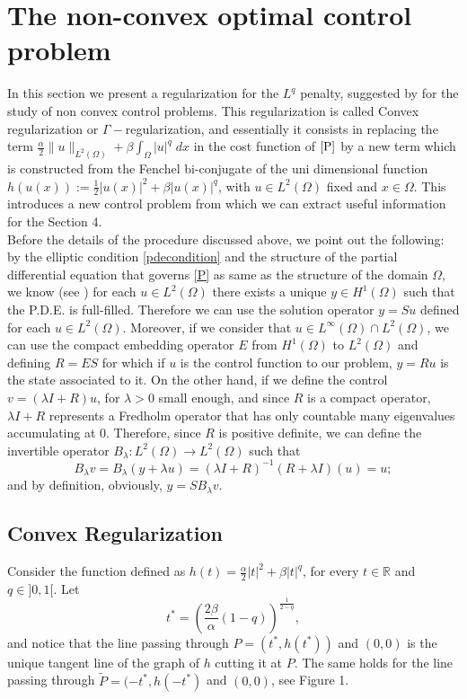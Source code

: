 \documentclass[11pt,a4paper]{amsart}
\newcommand{\om}{\Omega}
\newcommand{\norm}[1]{\lVert #1 \rVert}
\begin{document}
\section{The non-convex optimal control problem}

In this section we present a regularization for the $L^q$ penalty, suggested by \cite{eck} for the study of non convex control problems. This regularization is called Convex regularization or $\Gamma-$regularization, and essentially it consists in replacing the term $\frac{\alpha}{2}\norm{u}_{L^2(\Omega)}+\beta\int_{\Omega}|u|^q\; dx$ in the cost function of $\eqref{P}$ by a new term which is constructed from the Fenchel bi-conjugate of the uni dimensional function $h(u(x)):=\frac{1}{2}|u(x)|^2+\beta|u(x)|^q$, with $u\in L^{2}(\Omega)$ fixed and $x\in \Omega$. This introduces a new control problem from which we can extract useful information for the Section 4.\\

Before the details of the procedure discussed above, we point out the following: by the elliptic condition \eqref{pdecondition} and the structure of the partial differential equation that governs \eqref{P} as same as the structure of the domain $\Omega$, we know (see \cite{trol}) for each $u\in L^2(\Omega)$ there exists a unique $y\in H^1(\Omega)$ such that the P.D.E. is full-filled. Therefore we can use the solution operator $y=Su$ defined for each $u\in L^2(\Omega)$. Moreover, if we consider that $u\in L^{\infty}(\Omega)\cap L^2(\Omega)$, we can use the compact embedding operator $E$ from $H^1(\Omega)$ to $L^2(\Omega)$ and defining $R=ES$ for which if $u$ is the control function to our problem, $y=Ru$ is the state associated to it. On the other hand, if we define the control $v=(\lambda I+R)u$, for $\lambda>0$ small enough, and since  $R$ is a compact operator, $\lambda I+R$ represents a Fredholm operator that has only countable many eigenvalues accumulating at $0$. Therefore, since $R$ is positive definite, we can define the invertible operator $B_{\lambda}:L^{2}(\om)\to L^{2}(\om)$ such that
\[    B_{\lambda}v=B_{\lambda}(y+\lambda u)=(\lambda I+R)^{-1}(R+\lambda I)(u)=u;
\]
and by definition, obviously, $y=SB_{\lambda}v$. 


\subsection{Convex Regularization}

 Consider the function defined as $h(t)=\frac{\alpha}{2}|t|^2+\beta |t|^q$, for every $t\in \mathbb{R}$ and $q\in ]0,1[$. Let 
    \[
    t^*=\left(\frac{2\beta}{\alpha}(1-q)\right)^{\frac{1}{2-q}},
    \]
    and notice that the line passing through $P=(t^*,h(t^*))$ and $(0,0)$ is the unique tangent line of the graph of $h$ cutting it at $P$. The same holds for the line passing through $\tilde{P}=(-t^*,h(-t^*)$ and $(0,0)$, see Figure 1. 
    
\end{document}
